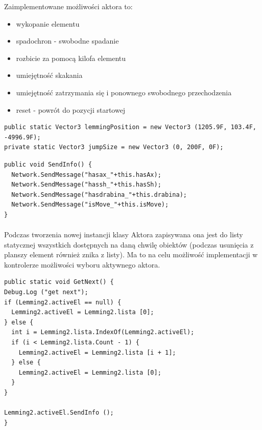 Zaimplementowane możliwości aktora to:

\begin{itemize}
  \item wykopanie elementu
  \item spadochron - swobodne spadanie
  \item rozbicie za pomocą kilofa elementu
  \item umiejętność skakania
  \item umiejętność zatrzymania się i ponownego swobodnego przechodzenia
  \item reset - powrót do pozycji startowej
\end{itemize}

\begin{lstlisting}[language=CSharp]
public static Vector3 lemmingPosition = new Vector3 (1205.9F, 103.4F, -4996.9F);
private static Vector3 jumpSize = new Vector3 (0, 200F, 0F);
\end{lstlisting}

\begin{lstlisting}[language=CSharp]
public void SendInfo() {
  Network.SendMessage("hasax_"+this.hasAx);
  Network.SendMessage("hassh_"+this.hasSh);
  Network.SendMessage("hasdrabina_"+this.drabina);
  Network.SendMessage("isMove_"+this.isMove);
}
\end{lstlisting}

\paragraph{}
Podczas tworzenia nowej instancji klasy Aktora zapisywana ona jest do listy statycznej wszystkich dostępnych na daną chwilę obiektów (podczas usunięcia z planszy element również znika z listy). Ma to na celu możliwość implementacji w kontrolerze możliwości wyboru aktywnego aktora.

\begin{lstlisting}[language=CSharp]
public static void GetNext() {
Debug.Log ("get next");
if (Lemming2.activeEl == null) {
  Lemming2.activeEl = Lemming2.lista [0];
} else {
  int i = Lemming2.lista.IndexOf(Lemming2.activeEl);
  if (i < Lemming2.lista.Count - 1) {
    Lemming2.activeEl = Lemming2.lista [i + 1];
  } else {
    Lemming2.activeEl = Lemming2.lista [0];
  }
}

Lemming2.activeEl.SendInfo ();
}
\end{lstlisting}

